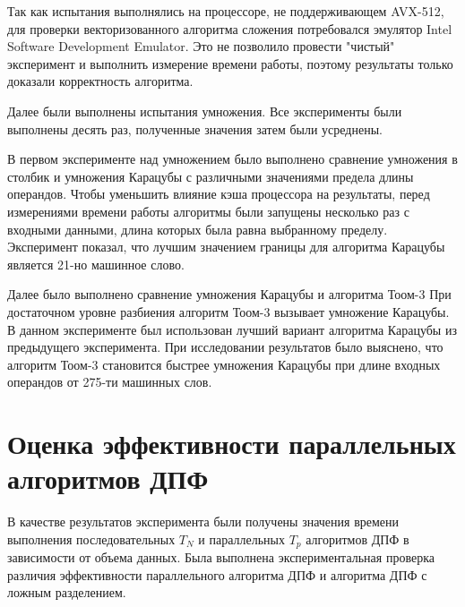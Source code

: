 Так как испытания выполнялись на процессоре, не поддерживающем AVX-512, для проверки векторизованного алгоритма сложения потребовался эмулятор Intel Software Development Emulator.
Это не позволило провести "чистый" эксперимент и выполнить измерение времени работы, поэтому результаты только доказали корректность алгоритма.

Далее были выполнены испытания умножения. Все эксперименты были выполнены десять раз, полученные значения затем были усреднены.

В первом эксперименте над умножением было выполнено сравнение умножения в столбик и умножения Карацубы с различными значениями предела длины операндов.
Чтобы уменьшить влияние кэша процессора на результаты, перед измерениями времени работы алгоритмы были запущены несколько раз с входными данными, длина которых была равна выбранному пределу.
Эксперимент показал, что лучшим значением границы для алгоритма Карацубы является 21-но машинное слово.

Далее было выполнено сравнение умножения Карацубы и алгоритма Тоом-3
При достаточном уровне разбиения алгоритм Тоом-3 вызывает умножение Карацубы.
В данном эксперименте был использован лучший вариант алгоритма Карацубы из предыдущего эксперимента.
При исследовании результатов было выяснено, что алгоритм Тоом-3 становится быстрее умножения Карацубы при длине входных операндов от 275-ти машинных слов.

\section{Оценка эффективности параллельных алгоритмов ДПФ}

В качестве результатов эксперимента были получены значения времени выполнения последовательных $T_N$ и параллельных $T_p$ алгоритмов ДПФ в зависимости от объема данных. Была выполнена экспериментальная проверка различия эффективности параллельного алгоритма ДПФ и алгоритма ДПФ с ложным разделением.

